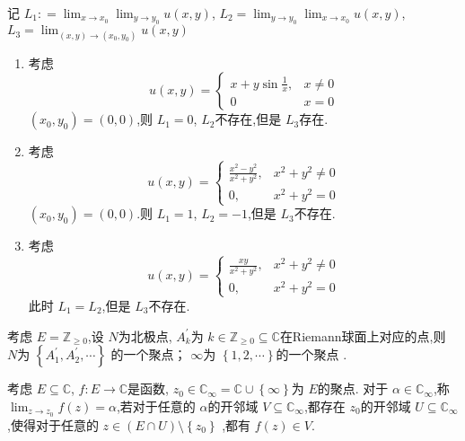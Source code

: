 \documentclass[../../复变函数.tex]{subfiles}
\begin{document}
\begin{example}

    记 \(  L_1: =  \lim_{x\to x_0}\lim_{y\to y_0} u\left( x,y \right)   \), \(  L_2 =  \lim_{y\to y_0}\lim_{x\to x_0}u\left( x,y \right)   \), \(  L_3= \lim_{\left( x,y \right)\to \left( x_0,y_0 \right)  }u\left( x,y \right)    \)   
    
    \begin{enumerate}
        \item 考虑  \[
        u\left( x,y \right) =  \begin{cases} x+ y\sin  \frac{1}{x},& x \neq 0\\ 
         0& x = 0 \end{cases}  
        \] \(  \left( x_0,y_0 \right)= \left( 0,0 \right)    \),则 \(  L_1 = 0  \), \(  L_2  \)不存在,但是 \(  L_3  \)存在.
        \item 考虑 \[
        u\left( x,y \right)= \begin{cases} \frac{x^{2}-y^{2} }{x^{2}+ y^{2} },& x^{2}+ y^{2}\neq 0\\ 
         0,& x^{2}+ y^{2}= 0  \end{cases}  
        \] \(  \left( x_0,y_0 \right)= \left( 0,0 \right)    \).则 \(  L_1 = 1  \), \(  L_2= -1  \),但是 \(  L_3  \)不存在.      
        \item 考虑 \[
        u\left( x,y \right)=  \begin{cases} \frac{xy }{ x^{2}+ y^{2}},& x^{2}+ y^{2}\neq 0  \\ 
          0,& x^{2}+ y^{2}= 0\end{cases}  
        \]此时 \(  L_1= L_2  \),但是 \(  L_3  \)不存在.  
    \end{enumerate}
    
\end{example}

\hspace*{\fill} 

\begin{proposition}
    考虑 \(  E =  \mathbb{Z} _{\ge 0}  \),设 \(  N  \)为北极点, \(  A_{k}^{\prime}   \)为 \(  k \in \mathbb{Z} _{\ge 0}\subseteq \mathbb{C}   \)在Riemann球面上对应的点,则 \(  N  \)为 \(  \left\{ A_1^{\prime} ,A_2^{\prime} ,\cdots  \right\}  \)      的一个聚点； \(  \infty  \)为 \(  \left\{ 1,2,\cdots  \right\}  \)的一个聚点  .
    
\end{proposition}
\begin{definition}
    考虑 \(  E\subseteq \mathbb{C}   \), \(  f:E\to \mathbb{C}   \)是函数, \(  z_0 \in \mathbb{C} _{\infty} = \mathbb{C}  \cup \left\{ \infty \right\}  \)为 \(  E  \)的聚点.
    对于 \(  \alpha  \in \mathbb{C} _{\infty}  \),称 \(  \lim_{z\to z_0}f\left( z \right)= \alpha    \),若对于任意的 \(  \alpha   \)的开邻域 \(  V  \subseteq \mathbb{C} _{\infty}\),都存在 \(  z_0  \)的开邻域 \(  U\subseteq \mathbb{C} _{\infty}  \)          
    ,使得对于任意的 \(  z \in \left( E\cap U \right)\setminus \left\{ z_0 \right\}   \) ,都有 \(  f\left( z \right)\in V   \). 
\end{definition}
\end{document}
